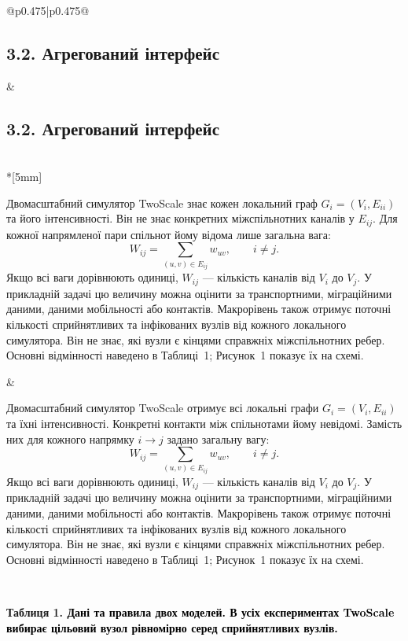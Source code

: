 \documentclass[11pt]{article}
\newcommand{\TS}{\textnormal{TwoScale}}
\begin{document}
\begin{longtable}{@{}p{0.475\textwidth}|p{0.475\textwidth}@{}}
\begin{minipage}[t]{\linewidth}
\subsection*{3.2. Агрегований інтерфейс}

\end{minipage} &
\begin{minipage}[t]{\linewidth}
\subsection*{3.2. Агрегований інтерфейс}

\end{minipage} \\*[5mm]
\begin{minipage}[t]{\linewidth}
Двомасштабний симулятор \TS{} знає кожен локальний граф $G_i=(V_i,E_{ii})$ та його інтенсивності. Він не знає конкретних міжспільнотних каналів у $E_{ij}$. Для кожної напрямленої пари спільнот йому відома лише загальна вага:
\begin{equation*}W_{ij}=\sum_{(u,v)\in E_{ij}}w_{uv},\qquad i\neq j.\tag{3}
\end{equation*}
Якщо всі ваги дорівнюють одиниці, $W_{ij}$ --- кількість каналів від $V_i$ до $V_j$. У прикладній задачі цю величину можна оцінити за транспортними, міграційними даними, даними мобільності або контактів. Макрорівень також отримує поточні кількості сприйнятливих та інфікованих вузлів від кожного локального симулятора. Він не знає, які вузли є кінцями справжніх міжспільнотних ребер. Основні відмінності наведено в Таблиці~1; Рисунок~1 показує їх на схемі.
\end{minipage} &
\begin{minipage}[t]{\linewidth}
Двомасштабний симулятор \TS{} отримує всі локальні графи $G_i=(V_i,E_{ii})$ та їхні інтенсивності. Конкретні контакти між спільнотами йому невідомі. Замість них для кожного напрямку $i\to j$ задано загальну вагу:
\begin{equation*}W_{ij}=\sum_{(u,v)\in E_{ij}}w_{uv},\qquad i\neq j.\tag{3}
\end{equation*}
Якщо всі ваги дорівнюють одиниці, $W_{ij}$ --- кількість каналів від $V_i$ до $V_j$. У прикладній задачі цю величину можна оцінити за транспортними, міграційними даними, даними мобільності або контактів. Макрорівень також отримує поточні кількості сприйнятливих та інфікованих вузлів від кожного локального симулятора. Він не знає, які вузли є кінцями справжніх міжспільнотних ребер. Основні відмінності наведено в Таблиці~1; Рисунок~1 показує їх на схемі.
\end{minipage} \\[5mm]
\begin{minipage}[t]{\linewidth}
\par\noindent\begin{minipage}{\linewidth}
\color{black}\centering
\par\small\textbf{Таблиця 1. \textcolor{black}{Дані та правила двох моделей. В усіх експериментах \TS{} вибирає цільовий вузол рівномірно серед сприйнятливих вузлів.}}


\end{minipage}
\end{minipage}
\end{longtable}
\end{document}
